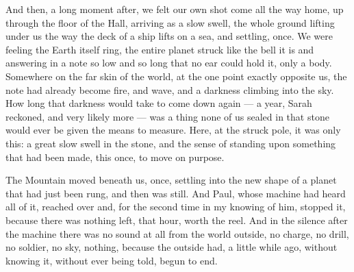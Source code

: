 And then, a long moment after, we felt our own shot come all the way home, up through the floor of the Hall, arriving as a slow swell, the whole ground lifting under us the way the deck of a ship lifts on a sea, and settling, once. We were feeling the Earth itself ring, the entire planet struck like the bell it is and answering in a note so low and so long that no ear could hold it, only a body. Somewhere on the far skin of the world, at the one point exactly opposite us, the note had already become fire, and wave, and a darkness climbing into the sky. How long that darkness would take to come down again --- a year, Sarah reckoned, and very likely more --- was a thing none of us sealed in that stone would ever be given the means to measure. Here, at the struck pole, it was only this: a great slow swell in the stone, and the sense of standing upon something that had been made, this once, to move on purpose.\par

The Mountain moved beneath us, once, settling into the new shape of a planet that had just been rung, and then was still. And Paul, whose machine had heard all of it, reached over and, for the second time in my knowing of him, stopped it, because there was nothing left, that hour, worth the reel. And in the silence after the machine there was no sound at all from the world outside, no charge, no drill, no soldier, no sky, nothing, because the outside had, a little while ago, without knowing it, without ever being told, begun to end.\par
